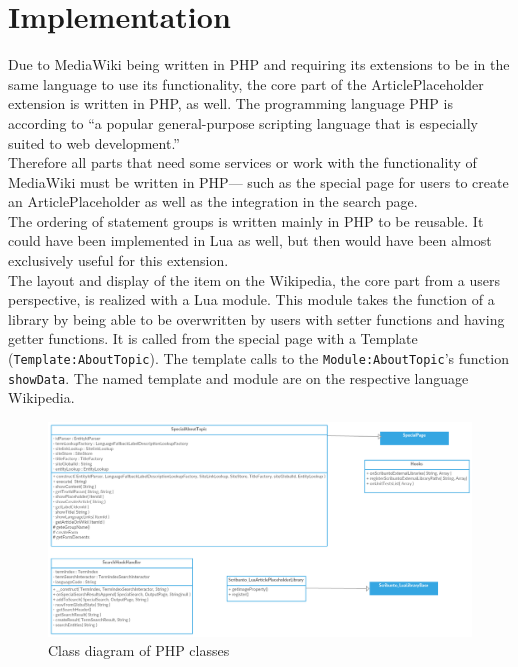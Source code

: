 \chapter{Implementation}
	
	Due to MediaWiki being written in PHP and requiring its extensions to be in the same language to use its functionality, the core part of the ArticlePlaceholder extension is written in PHP, as well. The programming language PHP is according to \citep{php:01} ``a popular general-purpose scripting language that is especially suited to web development.'' \\
	Therefore all parts that need some services or work with the functionality of MediaWiki must be written in PHP--- such as the special page for users to create an ArticlePlaceholder as well as the integration in the search page. \\
	The ordering of statement groups is written mainly in PHP to be reusable. It could have been implemented in Lua as well, but then would have been almost exclusively useful for this extension. \\
	The layout and display of the item on the Wikipedia, the core part from a users perspective, is realized with a Lua module. This module takes the function of a library by being able to be overwritten by users with setter functions and having getter functions. It is called from the special page with a Template (\texttt{\justify Template:AboutTopic}). The template calls to the \texttt{\justify Module:AboutTopic}'s function \texttt{\justify showData}. The named template and module are on the respective language Wikipedia. \\
	\begin{figure}[H]
	\centering
	\includegraphics[width=\textwidth]{diagrams/ArticlePlaceholderClassDiagram.png}
	\caption{Class diagram of PHP classes}
	\label{fig:ClassDiagramPHP}
	\end{figure}
	
	
	
	
	
	
	
	
	
	